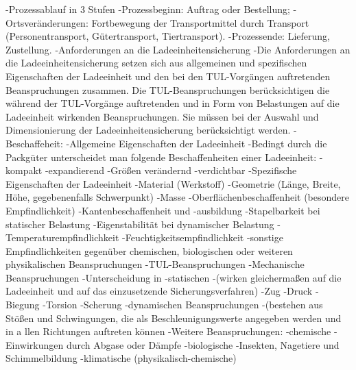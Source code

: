         -Prozessablauf in 3 Stufen
            -Prozessbeginn: Auftrag oder Bestellung;
            -Ortsveränderungen: Fortbewegung der Transportmittel durch Transport (Personentransport, Gütertransport, Tiertransport).
            -Prozessende: Lieferung, Zustellung.
    -Anforderungen an die Ladeeinheitensicherung
        -Die Anforderungen an die Ladeeinheitensicherung setzen sich aus allgemeinen und spezifischen Eigenschaften der Ladeeinheit und den bei den TUL-Vorgängen auftretenden Beanspruchungen zusammen. Die TUL-Beanspruchungen berücksichtigen die während der TUL-Vorgänge auftretenden und in Form von Belastungen auf die Ladeeinheit wirkenden Beanspruchungen. Sie müssen bei der Auswahl und Dimensionierung der Ladeeinheitensicherung berücksichtigt werden.
        -Beschaffeheit:
            -Allgemeine Eigenschaften der Ladeeinheit
                -Bedingt durch die Packgüter unterscheidet man folgende Beschaffenheiten einer Ladeeinheit:
                    -kompakt
                    -expandierend
                    -Größen verändernd
                    -verdichtbar
            -Spezifische Eigenschaften der Ladeeinheit
                -Material (Werkstoff)
                -Geometrie (Länge, Breite, Höhe, gegebenenfalls Schwerpunkt)
                -Masse
                -Oberflächenbeschaffenheit (besondere Empfindlichkeit)
                -Kantenbeschaffenheit und -ausbildung
                -Stapelbarkeit bei statischer Belastung
                -Eigenstabilität bei dynamischer Belastung
                -Temperaturempfindlichkeit
                -Feuchtigkeitsempfindlichkeit
                -sonstige Empfindlichkeiten gegenüber chemischen, biologischen oder weiteren physikalischen Beanspruchungen
        -TUL-Beanspruchungen
            -Mechanische Beanspruchungen
                -Unterscheidung in 
                    -statischen
                    -(wirken gleichermaßen auf die Ladeeinheit und auf das einzusetzende Sicherungsverfahren)
                        -Zug
                        -Druck
                        -Biegung
                        -Torsion
                        -Scherung
                    -dynamischen Beanspruchungen
                        -(bestehen aus Stößen und Schwingungen, die als Beschleunigungswerte angegeben werden und in a llen Richtungen auftreten können
            -Weitere Beanspruchungen:
                -chemische
                    -Einwirkungen durch Abgase oder Dämpfe
                -biologische
                    -Insekten, Nagetiere und Schimmelbildung
                -klimatische (physikalisch-chemische)
